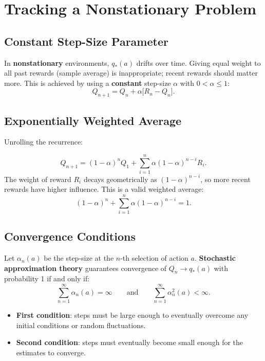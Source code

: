 \documentclass[11pt,a4paper]{article}
\theoremstyle{definition}
\theoremstyle{plain}
\theoremstyle{remark}
\begin{document}
\section{Tracking a Nonstationary Problem}

\subsection{Constant Step-Size Parameter}

In \textbf{nonstationary} environments, $q_*(a)$ drifts over time. Giving equal weight to all past rewards (sample average) is inappropriate; recent rewards should matter more. This is achieved by using a \textbf{constant} step-size $\alpha$ with $0 < \alpha \le 1$:
\[
    Q_{n+1} = Q_n + \alpha\bigl[R_n - Q_n\bigr].
\]

\subsection{Exponentially Weighted Average}

Unrolling the recurrence:
\begin{tcolorbox}[colback=blue!5!white,colframe=blue!75!black,title=\textbf{Exponentially Weighted (Recency-Biased) Average}]
\[
    Q_{n+1} = (1-\alpha)^n Q_1 + \sum_{i=1}^{n} \alpha(1-\alpha)^{n-i} R_i. %
\]
The weight of reward $R_i$ decays geometrically as $(1-\alpha)^{n-i}$, so more recent rewards have higher influence. This is a valid weighted average: %
\[
    (1-\alpha)^n + \sum_{i=1}^{n} \alpha(1-\alpha)^{n-i} = 1. %
\]
\end{tcolorbox}

\subsection{Convergence Conditions}

Let $\alpha_n(a)$ be the step-size at the $n$-th selection of action $a$. \textbf{Stochastic approximation theory} guarantees convergence of $Q_n \to q_*(a)$ with probability 1 if and only if:
\[
    \sum_{n=1}^{\infty} \alpha_n(a) = \infty
    \qquad \text{and} \qquad
    \sum_{n=1}^{\infty} \alpha_n^2(a) < \infty.
\]

\begin{itemize}
    \item \textbf{First condition}: steps must be large enough to eventually overcome any initial conditions or random fluctuations.
    \item \textbf{Second condition}: steps must eventually become small enough for the estimates to converge.
\end{itemize}
\end{document}
